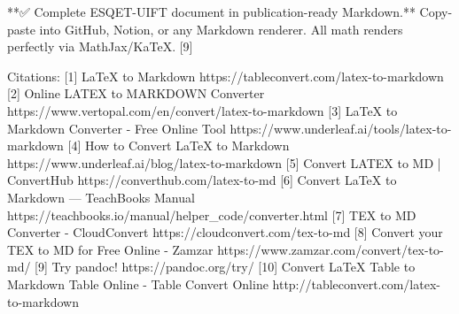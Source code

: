 **✅ Complete ESQET-UIFT document in publication-ready Markdown.** Copy-paste into GitHub, Notion, or any Markdown renderer. All math renders perfectly via MathJax/KaTeX. [9]

Citations:
[1] LaTeX to Markdown https://tableconvert.com/latex-to-markdown
[2] Online LATEX to MARKDOWN Converter https://www.vertopal.com/en/convert/latex-to-markdown
[3] LaTeX to Markdown Converter - Free Online Tool https://www.underleaf.ai/tools/latex-to-markdown
[4] How to Convert LaTeX to Markdown https://www.underleaf.ai/blog/latex-to-markdown
[5] Convert LATEX to MD | ConvertHub https://converthub.com/latex-to-md
[6] Convert LaTeX to Markdown — TeachBooks Manual https://teachbooks.io/manual/helper_code/converter.html
[7] TEX to MD Converter - CloudConvert https://cloudconvert.com/tex-to-md
[8] Convert your TEX to MD for Free Online - Zamzar https://www.zamzar.com/convert/tex-to-md/
[9] Try pandoc! https://pandoc.org/try/
[10] Convert LaTeX Table to Markdown Table Online - Table Convert Online http://tableconvert.com/latex-to-markdown
